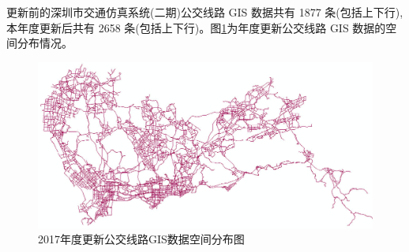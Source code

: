 更新前的深圳市交通仿真系统(二期)公交线路 GIS 数据共有 1877 条(包括上下行),本年度更新后共有 2658 条(包括上下行)。图\ref{fig:2017年度更新公交线路GIS数据空间分布图}为年度更新公交线路 GIS 数据的空间分布情况。

\begin{figure}[ht]
  \centering
  \includegraphics[width=\textwidth]{figures/chp02_2017年度更新公交线路GIS数据空间分布图.jpg}
  \caption{2017年度更新公交线路GIS数据空间分布图\label{fig:2017年度更新公交线路GIS数据空间分布图}}
\end{figure}

